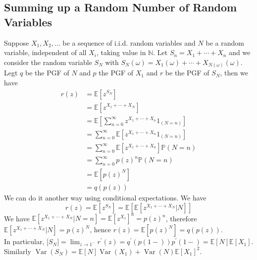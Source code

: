 \subsection{Summing up a Random Number of Random Variables}
Suppose $X_1,X_2,\ldots$ be a sequence of i.i.d. random variables and $N$ be a random variable, independent of all $X_i$, taking value in $\mathbb N$.
Let $S_n=X_1+\cdots +X_n$ and we consider the random variable $S_N$ with $S_N(\omega)=X_1(\omega)+\cdots+X_{N(\omega)}(\omega)$.
Legt $q$ be the PGF of $N$ and $p$ the PGF of $X_1$ and $r$ be the PGF of $S_N$, then we have
\begin{align*}
    r(z)&=\mathbb E[z^{S_N}]\\
    &=\mathbb E[z^{X_1+\cdots+X_N}]\\
    &=\mathbb E\left[ \sum_{n=0}^\infty z^{X_1+\cdots+X_n}1_{(N=n)} \right]\\
    &=\sum_{n=0}^\infty\mathbb E[z^{X_1+\cdots+X_n}1_{(N=n)}]\\
    &=\sum_{n=0}^\infty\mathbb E[z^{X_1+\cdots+X_n}]\mathbb P(N=n)\\
    &=\sum_{n=0}^\infty p(z)^n\mathbb P(N=n)\\
    &=\mathbb E[p(z)^N]\\
    &=q(p(z))
\end{align*}
We can do it another way using conditional expectations.
We have
$$r(z)=\mathbb E[z^{S_N}]=\mathbb E[\mathbb E[z^{X_1+\cdots+X_N}|N]]$$
We have $\mathbb E[z^{X_1+\cdots+X_N}|N=n]=\mathbb E[z^{X_1}]^n=p(z)^n$, therefore $\mathbb E[z^{X_1+\cdots+X_N}|N]=p(z)^N$, hence $r(z)=\mathbb E[p(z)^N]=q(p(z))$.\\
In particular, $\mathbb [S_N]=\lim_{z\to 1^-}r^\prime(z)=q^\prime(p(1-))p^\prime(1-)=\mathbb E[N]\mathbb E[X_1]$.
Similarly $\operatorname{Var}(S_N)=\mathbb E[N]\operatorname{Var}(X_1)+\operatorname{Var}(N)\mathbb E[X_1]^2$.
